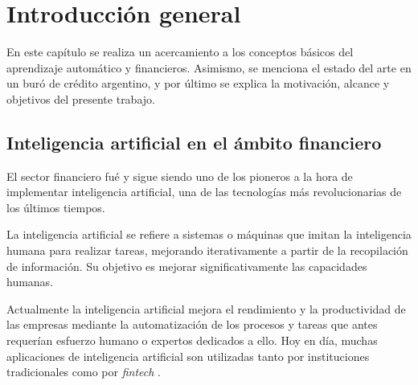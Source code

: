 
\chapter{Introducción general} %

\label{Chapter1} %
\label{IntroGeneral}


\newcommand{\keyword}[1]{\textbf{#1}}
\newcommand{\tabhead}[1]{\textbf{#1}}
\newcommand{\code}[1]{\texttt{#1}}
\newcommand{\file}[1]{\texttt{\bfseries#1}}
\newcommand{\option}[1]{\texttt{\itshape#1}}
\newcommand{\grados}{$^{\circ}$}

En este capítulo se realiza un acercamiento a los conceptos básicos del aprendizaje automático y financieros. Asimismo, se menciona el estado del arte en un buró de crédito argentino, y por último se explica la motivación, alcance y objetivos del presente trabajo.  
\section{Inteligencia artificial en el ámbito financiero}

El sector financiero fué y sigue siendo uno de los pioneros a la hora de implementar inteligencia artificial, una de las tecnologías más revolucionarias de los últimos tiempos.

La inteligencia artificial se refiere a sistemas o máquinas que imitan la inteligencia humana para realizar tareas, mejorando iterativamente a partir de la recopilación de información. Su objetivo es mejorar significativamente las capacidades humanas.
 
Actualmente  la inteligencia artificial mejora el rendimiento y la productividad de las empresas mediante la automatización de los procesos y tareas que antes requerían esfuerzo humano o expertos dedicados a ello.
Hoy en día, muchas aplicaciones de inteligencia artificial son utilizadas tanto por instituciones tradicionales como por \textit{fintech} \cite{molina}. 


